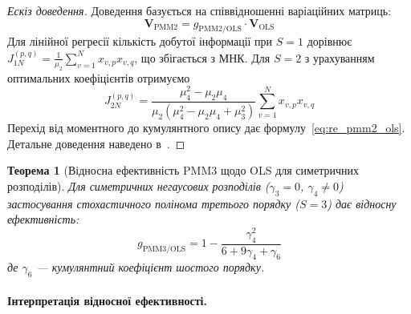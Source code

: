 \documentclass[12pt,a4paper]{article}
\newtheorem{theorem}{Теорема}[section]
\begin{document}
\begin{proof}[Ескіз доведення]
Доведення базується на співвідношенні варіаційних матриць:
\begin{equation}
\mathbf{V}_{\text{PMM2}} = g_{\text{PMM2/OLS}} \cdot \mathbf{V}_{\text{OLS}}
\end{equation}
Для лінійної регресії кількість добутої інформації при $S=1$ дорівнює $J_{1N}^{(p,q)} = \frac{1}{\mu_2}\sum_{v=1}^{N} x_{v,p} x_{v,q}$, що збігається з МНК. Для $S=2$ з урахуванням оптимальних коефіцієнтів отримуємо
\begin{equation}
J_{2N}^{(p,q)} = \frac{\mu_4^2 - \mu_2\mu_4}{\mu_2(\mu_4^2 - \mu_2\mu_4 + \mu_3^2)} \sum_{v=1}^{N} x_{v,p} x_{v,q}
\end{equation}
Перехід від моментного до кумулянтного опису дає формулу~\eqref{eq:re_pmm2_ols}. Детальне доведення наведено в~\cite{kunchenko2002polynomial,zabolotnii2018polynomial}.
\end{proof}

\begin{theorem}[Відносна ефективність PMM3 щодо OLS для симетричних розподілів]
\label{thm:relative_efficiency_pmm3}
Для симетричних негаусових розподілів ($\gamma_3 = 0$, $\gamma_4 \neq 0$) застосування стохастичного полінома третього порядку ($S=3$) дає відносну ефективність:
\begin{equation}
\label{eq:re_pmm3_ols}
g_{\text{PMM3/OLS}} = 1 - \frac{\gamma_4^2}{6 + 9\gamma_4 + \gamma_6}
\end{equation}
де $\gamma_6$ --- кумулянтний коефіцієнт шостого порядку.
\end{theorem}

\paragraph{Інтерпретація відносної ефективності.}
\end{document}
